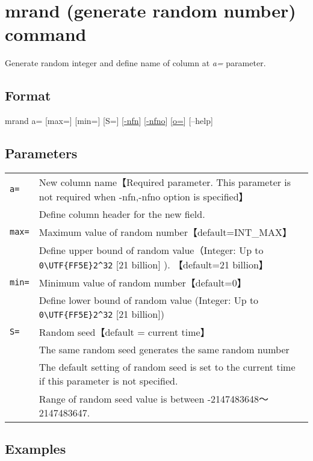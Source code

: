 \documentclass[a4paper]{jarticle}
\begin{document}
\setlength{\baselineskip}{4mm}

\section*{mrand (generate random number) command}
Generate random integer and define name of column at \emph{a=} parameter. 

\subsection*{Format}
mrand a= [max=] [min=] [S=] [\href{run:option.pdf}{-nfn}] [\href{run:option.pdf}{-nfno}] [\href{run:option.pdf}{o=}] [--help]\\

\subsection*{Parameters}
\begin{table}[htbp]
{\small
\begin{tabular}{ll}
\verb|a=|    & New column name【Required parameter. This parameter is not required when -nfn,-nfno option is specified】\\
& Define column header for the new field. \\
\verb|max=|    & Maximum value of random number【default=INT\_MAX】\\
& Define upper bound of random value（Integer: Up to \verb|0\UTF{FF5E}2^32| [21 billion] ). 【default=21 billion】\\
\verb|min=|    & Minimum value of random number【default=0】\\
& Define lower bound of random value  (Integer: Up to \verb|0\UTF{FF5E}2^32| [21 billion])\\
\verb|S=|  & Random seed【default = current time】\\
& The same random seed generates the same random number \\
& The default setting of random seed is set to the current time if this parameter is not specified.  \\
& Range of random seed value is between -2147483648〜2147483647. \\
\end{tabular} 
}
\end{table} 


\subsection*{Examples}
\end{document}
